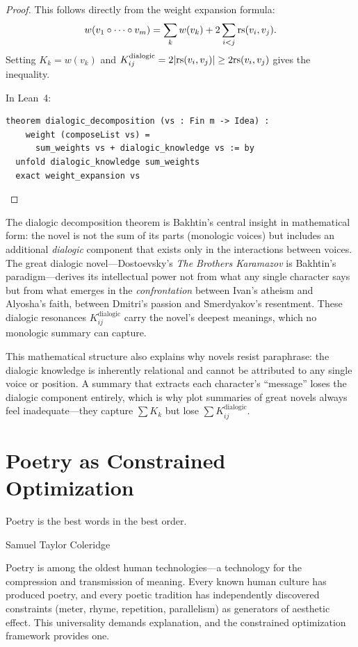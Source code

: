 \begin{proof}
This follows directly from the weight expansion formula:
\[
  w(v_1 \circ \cdots \circ v_m)
  = \sum_{k} w(v_k) + 2\sum_{i<j} \mathrm{rs}(v_i, v_j).
\]
Setting $K_k = w(v_k)$ and $K_{ij}^{\text{dialogic}} = 2|\mathrm{rs}(v_i, v_j)|
\geq 2\mathrm{rs}(v_i, v_j)$ gives the inequality.

In Lean~4:
\begin{lstlisting}
theorem dialogic_decomposition (vs : Fin m -> Idea) :
    weight (composeList vs) =
      sum_weights vs + dialogic_knowledge vs := by
  unfold dialogic_knowledge sum_weights
  exact weight_expansion vs
\end{lstlisting}
\end{proof}

\begin{remark}
The dialogic decomposition theorem is Bakhtin's central insight in mathematical
form: the novel is not the sum of its parts (monologic voices) but includes
an additional \emph{dialogic} component that exists only in the interactions
between voices.  The great dialogic novel---Dostoevsky's \textit{The Brothers
Karamazov} is Bakhtin's paradigm---derives its intellectual power not from what
any single character says but from what emerges in the \emph{confrontation}
between Ivan's atheism and Alyosha's faith, between Dmitri's passion and
Smerdyakov's resentment.  These dialogic resonances $K_{ij}^{\text{dialogic}}$
carry the novel's deepest meanings, which no monologic summary can capture.

This mathematical structure also explains why novels resist paraphrase: the
dialogic knowledge is inherently relational and cannot be attributed to any
single voice or position.  A summary that extracts each character's ``message''
loses the dialogic component entirely, which is why plot summaries of great
novels always feel inadequate---they capture $\sum K_k$ but lose
$\sum K_{ij}^{\text{dialogic}}$.
\end{remark}


\chapter{Poetry as Constrained Optimization}
\label{ch:poetry-optimization}

\epigraph{Poetry is the best words in the best order.}{Samuel Taylor Coleridge}


Poetry is among the oldest human technologies---a technology for the compression and transmission of meaning.  Every known human culture has produced poetry, and every poetic tradition has independently discovered constraints (meter, rhyme, repetition, parallelism) as generators of aesthetic effect.  This universality demands explanation, and the constrained optimization framework provides one.

